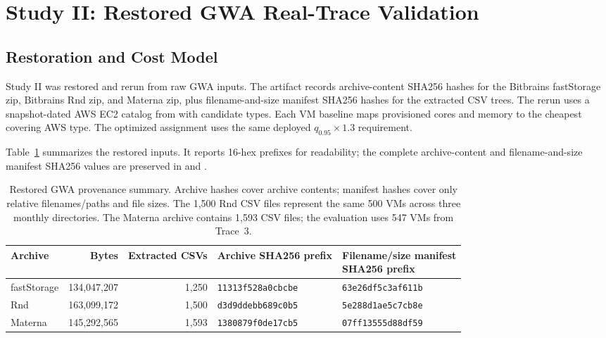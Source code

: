 \documentclass[11pt]{article}
\begin{document}
\FloatBarrier

\section{Study II: Restored GWA Real-Trace Validation}
\label{sec:study2}

\subsection{Restoration and Cost Model}

Study II was restored and rerun from raw GWA inputs. The artifact records
archive-content SHA256 hashes for the Bitbrains fastStorage zip, Bitbrains Rnd
zip, and Materna zip, plus filename-and-size manifest SHA256 hashes for the
extracted CSV trees. The rerun uses a
snapshot-dated AWS EC2 catalog from \extSnapshot{} with \extCatalogSize{}
candidate types. Each VM baseline maps provisioned cores and memory to the
cheapest covering AWS type. The optimized assignment uses the same deployed
$q_{0.95}\times1.3$ requirement.

Table~\ref{tab:gwa-provenance} summarizes the restored inputs. It reports
16-hex prefixes for readability; the complete archive-content and
filename-and-size manifest SHA256 values are preserved in
 and .

\begin{table}[t]
\caption{Restored GWA provenance summary. Archive hashes cover archive
contents; manifest hashes cover only relative filenames/paths and file sizes.
The 1,500 Rnd CSV files represent the same 500 VMs across three monthly
directories. The Materna archive contains 1,593 CSV files; the evaluation uses
547 VMs from Trace~3.}
\label{tab:gwa-provenance}
\centering
\small
\renewcommand{\arraystretch}{1.08}
\begin{tabular}{@{}l r r l l@{}}
\toprule
Archive & Bytes & Extracted CSVs & Archive SHA256 prefix &
\shortstack{Filename/size manifest\\SHA256 prefix} \\
\midrule
fastStorage & 134,047,207 & 1,250 & \texttt{11313f528a0cbcbe} & \texttt{63e26df5c3af611b} \\
Rnd & 163,099,172 & 1,500 & \texttt{d3d9ddebb689c0b5} & \texttt{5e288d1ae5c7cb8e} \\
Materna & 145,292,565 & 1,593 & \texttt{1380879f0de17cb5} & \texttt{07ff13555d88df59} \\
\bottomrule
\end{tabular}
\end{table}
\end{document}
